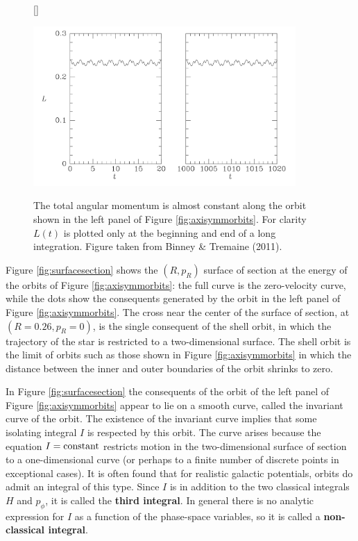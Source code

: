 \documentclass[a4paper,10pt]{article}
\begin{document}
\begin{figure}[t]
    [\FBwidth]
    {\caption{\footnotesize{The total angular momentum is almost constant along the orbit shown in the left panel of Figure \ref{fig:axisymmorbits}. For clarity $L(t)$ is plotted only at the beginning and end of a long integration. Figure taken from Binney \& Tremaine (2011).}}
    \label{fig:lvst}}
    {\includegraphics[width=10cm]{figures/Lvst.png}}
\end{figure}

{\noindent}Figure \ref{fig:surfacesection} shows the $(R,p_R)$ surface of section at the energy of the orbits of Figure \ref{fig:axisymmorbits}: the full curve is the zero-velocity curve, while the dots show the consequents generated by the orbit in the left panel of Figure \ref{fig:axisymmorbits}. The cross near the center of the surface of section, at $(R=0.26,p_R=0)$, is the single consequent of the shell orbit, in which the trajectory of the star is restricted to a two-dimensional surface. The shell orbit is the limit of orbits such as those shown in Figure \ref{fig:axisymmorbits} in which the distance between the inner and outer boundaries of the orbit shrinks to zero.

{\noindent}In Figure \ref{fig:surfacesection} the consequents of the orbit of the left panel of Figure \ref{fig:axisymmorbits} appear to lie on a smooth curve, called the invariant curve of the orbit. The existence of the invariant curve implies that some isolating integral $I$ is respected by this orbit. The curve arises because the equation $I={\rm constant}$ restricts motion in the two-dimensional surface of section to a one-dimensional curve (or perhaps to a finite number of discrete points in exceptional cases). It is often found that for realistic galactic potentials, orbits do admit an integral of this type. Since $I$ is in addition to the two classical integrals $H$ and $p_\phi$, it is called the \textbf{third integral}. In general there is no analytic expression for $I$ as a function of the phase-space variables, so it is called a \textbf{non-classical integral}.
\end{document}
